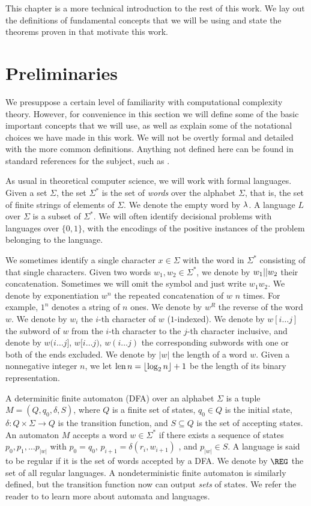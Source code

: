 This chapter is a more technical introduction to the rest of this work. 
We lay out the definitions of fundamental concepts that we will be using
and state the theorems proven in \cite{ConstructiveSeparations} that 
motivate this work. 

\section{Preliminaries}

We presuppose a certain level of familiarity with computational complexity theory. However, 
for convenience in this section we will define some of the basic important concepts 
that we will use, as well as explain some of the notational choices we have made
in this work. We will not be overtly formal and detailed with the more common definitions.
Anything not defined here can be found in standard references for the subject, 
such as \cite{AB09}.

As usual in theoretical computer science, we will work with formal languages.
Given a set $\Sigma$, the set $\Sigma^*$ is the set of \emph{words} over 
the alphabet $\Sigma$, that is, the set of finite strings of elements of $\Sigma$.
We denote the empty word by $\lambda$. 
A language $L$ over $\Sigma$ is a subset of $\Sigma^*$. We will often identify
decisional problems with languages over $\{0, 1\}$, with the encodings of the positive instances of the 
problem belonging to the language. 

We sometimes identify a single character $x \in \Sigma$ with the word in $\Sigma^*$ consisting of that
single characters. Given two words $w_1, w_2 \in \Sigma^*$, we denote by $w_1 || w_2$ their 
concatenation. Sometimes we will omit the symbol and just write $w_1w_2$. We denote by exponentiation
$w^n$ the repeated concatenation of $w$ $n$ times. For example, $1^n$ denotes a string of $n$ ones.
We denote by $w^R$ the reverse of the word $w$. We denote by $w_i$ the $i$-th character of $w$ 
($1$-indexed).
We denote by $w[i \ldots j]$ the subword of 
$w$ from the $i$-th character to the $j$-th character inclusive, and denote by 
$w(i \ldots j]$, $w[i \ldots j)$, $w(i \ldots j)$ the corresponding subwords with one or both of the
ends excluded. 
We denote by $|w|$ the length of a word $w$. Given a nonnegative integer $n$, we let 
$\operatorname{len} n = \lfloor \log_2 n \rfloor + 1$ be the length of its binary representation.  

A determinitic finite automaton (DFA) over an alphabet $\Sigma$ is a tuple $M = (Q, q_0, \delta, S)$, 
where $Q$ is a finite set of states, $q_0 \in Q$ is the initial state, 
$\delta \colon Q \times \Sigma \to Q$ is the transition function, and $S \subseteq Q$ is the 
set of accepting states. An automaton $M$ accepts a word $w \in \Sigma^*$ if there exists a sequence
of states $p_0, p_1, \ldots p_{|w|}$ with $p_0 = q_0$, $p_{i+1} = \delta(r_i, w_{i+1})$ , and 
$p_{|w|} \in S$. A language is said to be regular if it is the set of words accepted by a 
DFA. We denote by $\REG$ the set of all regular languages.
A nondeterministic finite automaton is similarly defined, but the transition function now 
can output \emph{sets} of states. We refer the reader to \cite{HopcroftUllman} to learn more about
automata and languages. 

